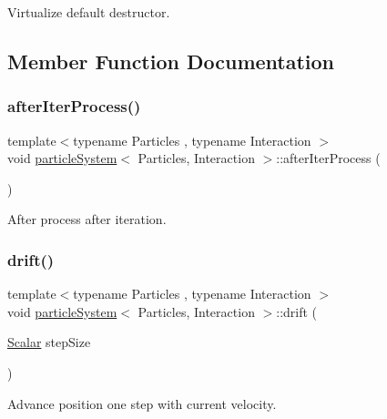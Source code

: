 Virtualize default destructor. 



\subsection{Member Function Documentation}
\mbox{\label{classparticle_system_a12fa297e1f6674847c2b90761f30d336}} 
\subsubsection{\texorpdfstring{after\+Iter\+Process()}{afterIterProcess()}}
{\footnotesize\ttfamily template$<$typename Particles , typename Interaction $>$ \\
void \mbox{\hyperlink{classparticle_system}{particle\+System}}$<$ Particles, Interaction $>$\+::after\+Iter\+Process (\begin{DoxyParamCaption}{ }\end{DoxyParamCaption})\hspace{0.3cm}{\ttfamily [inline]}}



After process after iteration. 

\mbox{\label{classparticle_system_a3f88bac7a0941910cbffe4ec6b1f32ec}} 
\subsubsection{\texorpdfstring{drift()}{drift()}}
{\footnotesize\ttfamily template$<$typename Particles , typename Interaction $>$ \\
void \mbox{\hyperlink{classparticle_system}{particle\+System}}$<$ Particles, Interaction $>$\+::drift (\begin{DoxyParamCaption}\item[{\mbox{\hyperlink{classparticle_system_a3938954186247e3eab01cc75fcc62b40}{Scalar}}}]{step\+Size }\end{DoxyParamCaption})\hspace{0.3cm}{\ttfamily [inline]}}



Advance position one step with current velocity. 

